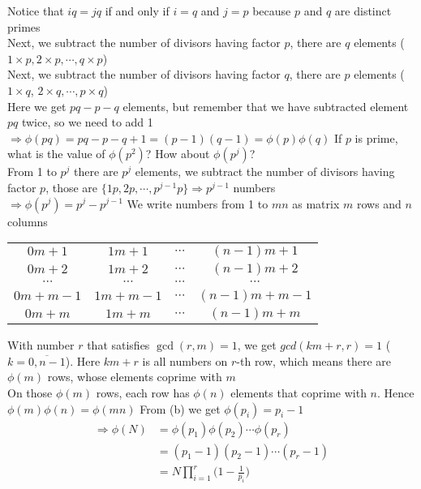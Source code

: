 		 Notice that $iq = jq$ if and only if $i=q$ and $j=p$ because $p$ and $q$ are distinct primes \\ Next, we subtract the number of divisors having factor $p$, there are $q$ elements ($1 \times p, 2 \times p, \cdots, q \times p$) \\ Next, we subtract the number of divisors having factor $q$, there are $p$ elements ($1 \times q$, $2 \times q, \cdots, p \times q$) \\ Here we get $pq - p - q$ elements, but remember that we have subtracted element $pq$ twice, so we need to add 1 \\ $\Rightarrow \phi(pq) = pq - p - q + 1 = (p-1)(q-1) = \phi(p)\phi(q)$
		 If $p$ is prime, what is the value of $\phi(p^2)$? How about $\phi(p^j)$? \\ From 1 to $p^j$ there are $p^j$ elements, we subtract the number of divisors having factor $p$, those are $\{1p, 2p, \cdots, p^{j-1}p\} \Rightarrow p^{j-1}$ numbers \\ $\Rightarrow \phi(p^j) = p^j - p^{j-1}$
		 We write numbers from 1 to $mn$ as matrix $m$ rows and $n$ columns
		\begin{center}
			\begin{tabular}{c c c c}
				$0m+1$ & $1m+1$ & $\cdots$ & $(n-1)m+1$ \\ 
				$0m+2$ & $1m+2$ & $\cdots$ & $(n-1)m+2$ \\ 
				$\cdots$ & $\cdots$ & $\cdots$ & $\cdots$ \\ 
				$0m + m-1$ & $1m + m-1$ & $\cdots$ & $(n-1)m + m - 1$ \\
				$0m + m$ & $1 m + m$ & $\cdots$ & $(n-1)m + m$
			\end{tabular}
		\end{center}
		With number $r$ that satisfies $\gcd(r,m)=1$, we get $gcd(km+r,r)=1$ ($k=\overline{0, n-1}$). Here $km+r$ is all numbers on $r$-th row, which means there are $\phi(m)$ rows, whose elements coprime with $m$ \\ On those $\phi(m)$ rows, each row has $\phi(n)$ elements that coprime with $n$. Hence $\phi(m)\phi(n)=\phi(mn)$
		 From (b) we get $\phi(p_i) = p_i - 1$
		\begin{align*}
			\Rightarrow \phi(N) & = \phi(p_1)\phi(p_2)\cdots\phi(p_r) \\ & = (p_1 - 1)(p_2 -1)\cdots(p_r-1) \\ & = N\prod_{i=1}^{r}\Bigg(1-\frac{1}{p_i}\Bigg)
		\end{align*}
	


